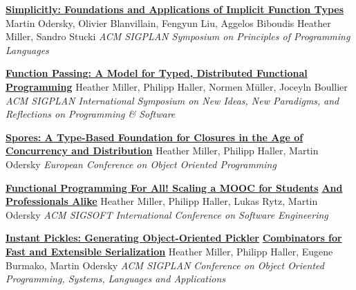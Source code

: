\documentclass[9pt]{article}
\begin{document}
\noindent\href{https://infoscience.epfl.ch/record/229878}{\bf Simplicitly: Foundations and Applications of Implicit Function Types}
\newline\noindent Martin Odersky, Olivier Blanvillain, Fengyun Liu, Aggelos Biboudis
\newline\noindent Heather Miller, Sandro Stucki
\newline\noindent\emph{ACM SIGPLAN Symposium on Principles of Programming Languages}
\bigskip

\noindent\href{https://infoscience.epfl.ch/record/205822}{\bf Function Passing: A Model for Typed, Distributed Functional}\vspace{-0.03in}
\newline\noindent\href{https://infoscience.epfl.ch/record/205822}{\bf Programming}
\newline\noindent Heather Miller, Philipp Haller, Normen M\"{u}ller, Joceyln Boullier
\newline\noindent\emph{ACM SIGPLAN International Symposium on New Ideas, New Paradigms,}
\newline\noindent\emph{and Reflections on Programming \& Software}
\bigskip

\noindent\href{http://infoscience.epfl.ch/record/191239}{\bf Spores: A Type-Based Foundation for Closures in the Age of}\vspace{-0.03in}
\newline\noindent\href{http://infoscience.epfl.ch/record/191239}{\bf Concurrency and Distribution}
\newline\noindent Heather Miller, Philipp Haller, Martin Odersky
\newline\noindent\emph{European Conference on Object Oriented Programming}
\bigskip

\noindent\href{http://infoscience.epfl.ch/record/190022}{\bf Functional Programming For All! Scaling a MOOC for Students}\vspace{-0.03in}
\newline\noindent\href{http://infoscience.epfl.ch/record/190022}{\bf And Professionals Alike}
\newline\noindent Heather Miller, Philipp Haller, Lukas Rytz, Martin Odersky
\newline\noindent\emph{ACM SIGSOFT International Conference on Software Engineering}
\bigskip

\noindent\href{http://infoscience.epfl.ch/record/188383}{\bf Instant Pickles: Generating Object-Oriented Pickler}\vspace{-0.03in}
\newline\noindent\href{http://infoscience.epfl.ch/record/188383}{\bf Combinators for Fast and Extensible Serialization}
\newline\noindent Heather Miller, Philipp Haller, Eugene Burmako, Martin Odersky
\newline\noindent\emph{ACM SIGPLAN Conference on Object Oriented Programming, Systems,}
\newline\noindent\emph{Languages and Applications}
\bigskip
\end{document}
